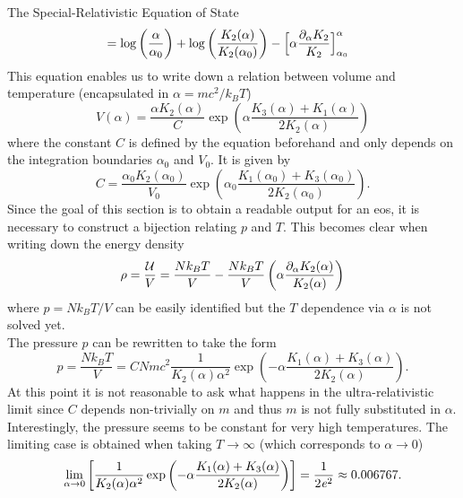 \begin{subsection}{The Special-Relativistic Equation of State}
\begin{align}
    &=\log\left(\frac{\alpha}{\alpha_0}\right) + \log\left(\frac{K_2(\alpha)}{K_2(\alpha_0)}\right) - \Bigl[\alpha\frac{\partial_\alpha K_2}{K_2}\Bigr]_{\alpha_0}^\alpha
\end{align}
This equation enables us to write down a relation between volume and temperature (encapsulated in $\alpha=mc^2/k_B T$)
\begin{equation}
	V(\alpha) = \frac{\alpha K_2(\alpha)}{C}\exp\left(\alpha\frac{K_3(\alpha)+K_1(\alpha)}{2K_2(\alpha)}\right)
	\label{eq:2-IntEner-Volume-Alpha-Dependence}
\end{equation}
where the constant $C$ is defined by the equation beforehand and only depends on the integration boundaries $\alpha_0$ and $V_0$.
It is given by
\begin{equation}
	C = \frac{\alpha_0 K_2(\alpha_0)}{V_0}\exp\left(\alpha_0\frac{K_1(\alpha_0)+K_3(\alpha_0)}{2K_2(\alpha_0)}\right).
	\label{eq:2-IntEner-Parameter-Eos-Integration-Result}
\end{equation}
Since the goal of this section is to obtain a readable output for an \ac{eos}, it is necessary to construct a bijection relating $p$ and $T$.
This becomes clear when writing down the energy density %
\begin{equation}
	\rho = \frac{\mathcal{U}}{V} = \frac{Nk_B T}{V} - \frac{Nk_B T}{V}\left(\alpha\frac{\partial_\alpha K_2(\alpha)}{K_2(\alpha)}\right)
	\label{eq:2-IntEner-DensityAlpha}
\end{equation}
where $p=Nk_B T/V$ can be easily identified but the $T$ dependence via $\alpha$ is not solved yet.\\
The pressure $p$ can be rewritten to take the form
\begin{equation}
	p = \frac{Nk_B T}{V} = CNmc^2\frac{1}{K_2(\alpha)\alpha^2}\exp\left(-\alpha\frac{K_1(\alpha)+K_3(\alpha)}{2K_2(\alpha)}\right).
	\label{eq:2-IntEner-PressureAlpha}
\end{equation}
At this point it is not reasonable to ask what happens in the ultra-relativistic limit since $C$ depends non-trivially on $m$ and thus $m$ is not fully substituted in $\alpha$.\\
Interestingly, the pressure seems to be constant for very high temperatures.
The limiting case is obtained when taking $T\rightarrow\infty$ (which corresponds to $\alpha\rightarrow0$)
\begin{equation}
	\lim\limits_{\alpha\to0}\left[\frac{1}{K_2(\alpha)\alpha^2}\exp\left(-\alpha\frac{K_1(\alpha)+K_3(\alpha)}{2K_2(\alpha)}\right)\right] = \frac{1}{2\e^2} \approx 0.006767.

\end{equation}
\end{subsection}
